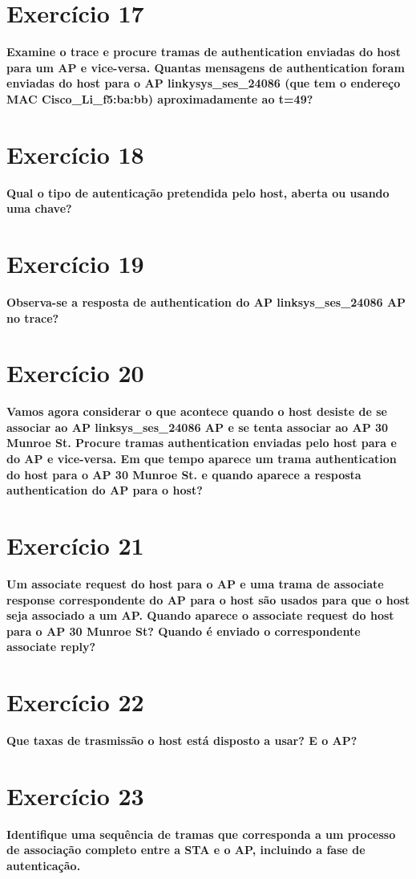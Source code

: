 \documentclass[a4paper]{report}
\begin{document}
\section{Exercício 17}
\textbf{Examine o trace e procure tramas de authentication enviadas do host para
    um AP e vice-versa. Quantas mensagens de authentication foram enviadas do
    host para o AP linkysys\_ses\_24086 (que tem o endereço MAC
    Cisco\_Li\_f5:ba:bb) aproximadamente ao t=49?}

\section{Exercício 18}
\textbf{Qual o tipo de autenticação pretendida pelo host, aberta ou usando uma
    chave?}

\section{Exercício 19}
\textbf{Observa-se a resposta de authentication do AP linksys\_ses\_24086 AP no
    trace?}

\section{Exercício 20}
\textbf{Vamos agora considerar o que acontece quando o host desiste de se
    associar ao AP linksys\_ses\_24086 AP e se tenta associar ao AP 30 Munroe
    St. Procure tramas authentication enviadas pelo host para e do AP e
    vice-versa. Em que tempo aparece um trama authentication do host para o AP
    30 Munroe St. e quando aparece a resposta authentication do AP para o host?}

\section{Exercício 21}
\textbf{Um associate request do host para o AP e uma trama de associate response
    correspondente do AP para o host são usados para que o host seja associado a
    um AP. Quando aparece o associate request do host para o AP 30 Munroe St?
    Quando é enviado o correspondente associate reply?}

\section{Exercício 22}
\textbf{Que taxas de trasmissão o host está disposto a usar? E o AP?}

\section{Exercício 23}
\textbf{Identifique uma sequência de tramas que corresponda a um processo de
    associação completo entre a STA e o AP, incluindo a fase de autenticação.}
\end{document}
